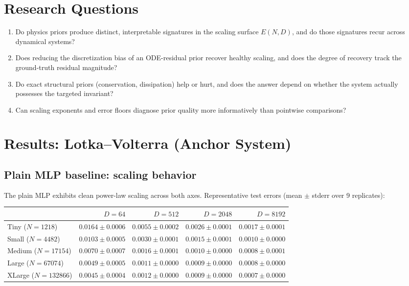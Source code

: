 \documentclass[11pt]{article}
\begin{document}
\section{Research Questions}

\begin{enumerate}[leftmargin=*, itemsep=0.3em]
    \item Do physics priors produce distinct, interpretable signatures in the scaling surface $E(N,D)$, and do those signatures recur across dynamical systems?
    \item Does reducing the discretization bias of an ODE-residual prior recover healthy scaling, and does the degree of recovery track the ground-truth residual magnitude?
    \item Do exact structural priors (conservation, dissipation) help or hurt, and does the answer depend on whether the system actually possesses the targeted invariant?
    \item Can scaling exponents and error floors diagnose prior quality more informatively than pointwise comparisons?
\end{enumerate}

\section{Results: Lotka--Volterra (Anchor System)}
\label{sec:results-lv}

\subsection{Plain MLP baseline: scaling behavior}
\label{sec:results-plain}

The plain MLP exhibits clean power-law scaling across both axes.
Representative test errors (mean $\pm$ stderr over 9 replicates):

\begin{center}
\small
\begin{tabular}{lrrrr}
\toprule
& $D = 64$ & $D = 512$ & $D = 2048$ & $D = 8192$ \\
\midrule
Tiny ($N\!=\!1218$)    & $0.0164 \pm 0.0006$ & $0.0055 \pm 0.0002$ & $0.0026 \pm 0.0001$ & $0.0017 \pm 0.0001$ \\
Small ($N\!=\!4482$)   & $0.0103 \pm 0.0005$ & $0.0030 \pm 0.0001$ & $0.0015 \pm 0.0001$ & $0.0010 \pm 0.0000$ \\
Medium ($N\!=\!17154$) & $0.0070 \pm 0.0007$ & $0.0016 \pm 0.0001$ & $0.0010 \pm 0.0000$ & $0.0008 \pm 0.0001$ \\
Large ($N\!=\!67074$)  & $0.0049 \pm 0.0005$ & $0.0011 \pm 0.0000$ & $0.0009 \pm 0.0000$ & $0.0008 \pm 0.0000$ \\
XLarge ($N\!=\!132866$)& $0.0045 \pm 0.0004$ & $0.0012 \pm 0.0000$ & $0.0009 \pm 0.0000$ & $0.0007 \pm 0.0000$ \\
\bottomrule
\end{tabular}
\end{center}
\end{document}
